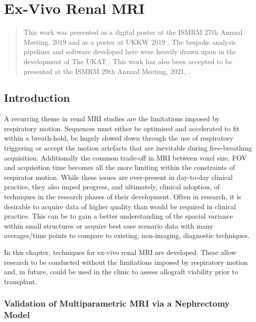 \chapter{Ex-Vivo Renal MRI}
\label{chap:ex}

\begin{abstract}
	This work was presented as a digital poster at the \ac{ISMRM} 27th Annual Meeting, 2019 \cite{daniel_effects_2019} and as a poster at \ac{UKKW} 2019 \cite{kazmi_determining_2019}. The bespoke analysis pipelines and software developed here were heavily drawn upon in the development of The \ac{UKAT} \cite{nery_ukrin_2020}. This work has also been accepted to be presented at the \ac{ISMRM} 29th Annual Meeting, 2021, \cite{daniel_ukrin_2021}.
\end{abstract}
\acresetall
\newpage
\section{Introduction}

A recurring theme in renal \ac{MRI} studies are the limitations imposed by respiratory motion. Sequences must either be optimised and accelerated to fit within a breath-hold, be hugely slowed down through the use of respiratory triggering or accept the motion artefacts that are inevitable during free-breathing acquisition. Additionally the common trade-off in \ac{MRI} between voxel size, \ac{FOV} and acquisition time becomes all the more limiting within the constraints of respirator motion. While these issues are ever-present in day-to-day clinical practice, they also imped progress, and ultimately, clinical adoption, of techniques in the research phases of their development. Often in research, it is desirable to acquire data of higher quality than would be required in clinical practice. This can be to gain a better understanding of the spacial variance within small structures or acquire best case scenario data with many averages/time points to compare to existing, non-imaging, diagnostic techniques.

In this chapter, techniques for ex-vivo renal \ac{MRI} are developed. These allow research to be conducted without the limitations imposed by respiratory motion and, in future, could be used in the clinic to assess allograft viability prior to transplant.

\subsection{Validation of Multiparametric MRI via a Nephrectomy Model}

